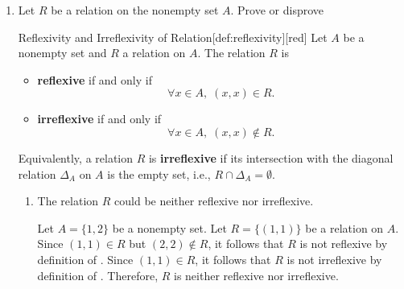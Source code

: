 \begin{enumerate}
  \newpage
  \item Let $R$ be a relation on the nonempty set $A$. Prove or disprove
  \begin{define}{Reflexivity and Irreflexivity of Relation}[def:reflexivity][red]
    Let $A$ be a nonempty set and $R$ a relation on $A$. The relation $R$ is
    \begin{itemize}
      \item \textbf{reflexive} if and only if
        \[
          \forall x \in A,\; (x, x) \in R.
        \]
      \item \textbf{irreflexive} if and only if
        \[
          \forall x \in A,\; (x, x) \notin R.
        \]
    \end{itemize}
    Equivalently, a relation $R$ is \textbf{irreflexive} if its intersection 
    with the diagonal relation $\Delta_A$ on $A$ is the empty set, 
    i.e., $R \cap \Delta_A = \emptyset$.
  \end{define}
  \begin{enumerate}
    \item The relation $R$ could be neither reflexive nor irreflexive.
      \begin{subprove}
        Let $A = \{1,2\}$ be a nonempty set. Let $R = \{(1,1)\}$ be a relation on $A$. 
        Since $(1,1) \in R$ but $(2,2) \notin R$, it follows that $R$ is not reflexive by definition of . 
        Since $(1,1) \in R$, it follows that $R$ is not irreflexive by definition of . 
        Therefore, $R$ is neither reflexive nor irreflexive.
      \end{subprove}




\end{enumerate}
\end{enumerate}
